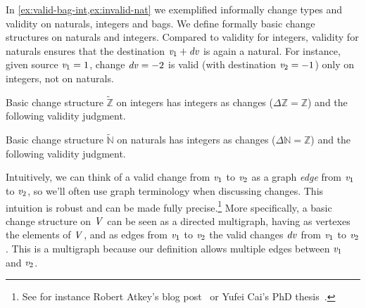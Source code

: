 \begin{example}
In \cref{ex:valid-bag-int,ex:invalid-nat} we exemplified
informally change types and validity on naturals, integers and
bags.
We define formally basic change structures on naturals and integers.
Compared to validity for integers, validity for naturals ensures that the
destination \ensuremath{\Varid{v}_{1}\mathbin{+}\Varid{dv}} is again a natural. For instance, given source \ensuremath{\Varid{v}_{1}\mathrel{=}\mathrm{1}}, change \ensuremath{\Varid{dv}\mathrel{=}\mathbin{-}\mathrm{2}} is valid (with destination \ensuremath{\Varid{v}_{2}\mathrel{=}\mathbin{-}\mathrm{1}}) only on integers, not
on naturals.
\end{example}
\begin{definition}
  Basic change structure \ensuremath{\widetilde{\mathbb{Z}}} on integers has integers as changes
  (\ensuremath{\Delta \mathbb{Z}\mathrel{=}\mathbb{Z}}) and the following validity judgment.
\begin{typing}
  \Axiom
  {}
\end{typing}
\end{definition}

\begin{definition}
  Basic change structure \ensuremath{\widetilde{\mathbb{N}}} on naturals has integers as changes
  (\ensuremath{\Delta \mathbb{N}\mathrel{=}\mathbb{Z}}) and the following validity judgment.
\begin{typing}
  {}
\end{typing}
\end{definition}

Intuitively, we can think of a valid change from \ensuremath{\Varid{v}_{1}} to \ensuremath{\Varid{v}_{2}} as a graph
\emph{edge} from \ensuremath{\Varid{v}_{1}} to \ensuremath{\Varid{v}_{2}}, so we'll often use graph terminology when
discussing changes. This intuition is robust and can be made fully
precise.\footnote{See for instance Robert Atkey's blog post~\citep{Atkey2015ILC}
  or Yufei Cai's PhD thesis~\citep{CaiPhD}.}
More specifically, a basic change structure on \ensuremath{\Conid{V}} can
be seen as a directed multigraph, having as vertexes the elements of \ensuremath{\Conid{V}}, and as
edges from \ensuremath{\Varid{v}_{1}} to \ensuremath{\Varid{v}_{2}} the valid changes \ensuremath{\Varid{dv}} from \ensuremath{\Varid{v}_{1}} to \ensuremath{\Varid{v}_{2}}. This is a
multigraph because our definition allows multiple edges between \ensuremath{\Varid{v}_{1}} and \ensuremath{\Varid{v}_{2}}.

